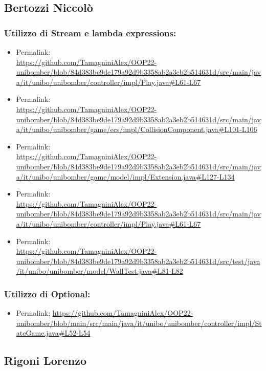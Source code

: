 \documentclass[a4paper,12pt]{report}
\begin{document}
\subsection*{Bertozzi Niccolò}
\subsubsection*{Utilizzo di Stream e lambda expressions:}
\begin{itemize}
    \item Permalink: 
    \\ \url{https://github.com/TamagniniAlex/OOP22-unibomber/blob/84d383be9de179a92d9b3358ab2a3eb2b514631d/src/main/java/it/unibo/unibomber/controller/impl/Play.java#L61-L67}
    \item Permalink: 
    \\ \url{https://github.com/TamagniniAlex/OOP22-unibomber/blob/84d383be9de179a92d9b3358ab2a3eb2b514631d/src/main/java/it/unibo/unibomber/game/ecs/impl/CollisionComponent.java#L101-L106}
    \item Permalink: 
    \\ \url{https://github.com/TamagniniAlex/OOP22-unibomber/blob/84d383be9de179a92d9b3358ab2a3eb2b514631d/src/main/java/it/unibo/unibomber/game/model/impl/Extension.java#L127-L134}
    \item Permalink: 
    \\ \url{https://github.com/TamagniniAlex/OOP22-unibomber/blob/84d383be9de179a92d9b3358ab2a3eb2b514631d/src/main/java/it/unibo/unibomber/controller/impl/Play.java#L61-L67}
    \item Permalink: 
    \\ \url{https://github.com/TamagniniAlex/OOP22-unibomber/blob/84d383be9de179a92d9b3358ab2a3eb2b514631d/src/test/java/it/unibo/unibomber/model/WallTest.java#L81-L82}
\end{itemize}
\subsubsection*{Utilizzo di Optional:}
\begin{itemize}
    \item Permalink: \url{https://github.com/TamagniniAlex/OOP22-unibomber/blob/main/src/main/java/it/unibo/unibomber/controller/impl/StateGame.java#L52-L54}
\end{itemize}
\subsection*{Rigoni Lorenzo}
\end{document}
